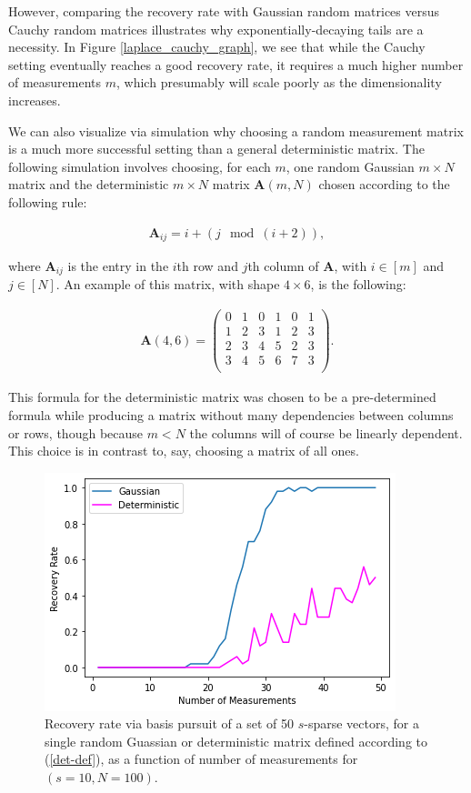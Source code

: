 \documentclass[12pt,a4paper]{amsart}
\numberwithin{equation}{section}
\theoremstyle{plain}
\theoremstyle{definition}
\newcommand{\bdA}{\mathbf{A}}
\begin{document}
However, comparing the recovery rate with Gaussian random matrices versus Cauchy random matrices illustrates why exponentially-decaying tails are a necessity. In Figure \ref{laplace_cauchy_graph}, we see that while the Cauchy setting eventually reaches a good recovery rate, it requires a much higher number of measurements $m$, which presumably will scale poorly as the dimensionality increases.

We can also visualize via simulation why choosing a random measurement matrix is a much more successful setting than a general deterministic matrix. The following simulation involves choosing, for each $m$, one random Gaussian $m\times N$ matrix and the deterministic $m\times N$ matrix $\bdA(m,N)$ chosen according to the following rule:

\begin{align}\label{det-def}
    \bdA_{ij}=i+(j\mod(i+2)),
\end{align}

where $\bdA_{ij}$ is the entry in the $i$th row and $j$th column of $\bdA$, with $i\in[m]$ and $j\in[N]$. An example of this matrix, with shape $4\times 6$, is the following:

\begin{align*}
    \bdA(4,6)=
    \begin{pmatrix}
        0 & 1 & 0 & 1 & 0 & 1 \\
        1 & 2 & 3 & 1 & 2 & 3 \\
        2 & 3 & 4 & 5 & 2 & 3 \\
        3 & 4 & 5 & 6 & 7 & 3 \\
    \end{pmatrix}.
\end{align*}

This formula for the deterministic matrix was chosen to be a pre-determined formula while producing a matrix without many dependencies between columns or rows, though because $m<N$ the columns will of course be linearly dependent. This choice is in contrast to, say, choosing a matrix of all ones.

\begin{figure}
    \centering
    \includegraphics[scale = 0.7]{gaussian_det.png}
    \caption{Recovery rate via basis pursuit of a set of 50 $s$-sparse vectors, for a single random Guassian or deterministic matrix defined according to (\ref{det-def}), as a function of number of measurements for $(s=10,N=100)$.}
    \label{det-graph}
\end{figure}
\end{document}
